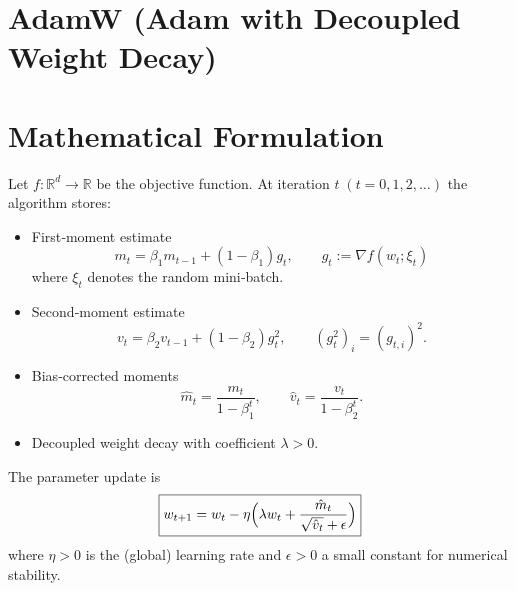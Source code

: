 \documentclass{article}
\newcommand{\R}{\mathbb{R}}
\begin{document}
\section*{AdamW (Adam with Decoupled Weight Decay)}

\section*{Mathematical Formulation}
Let $f:\R^{d}\rightarrow\R$ be the objective function.  
At iteration $t\;(t=0,1,2,\dots)$ the algorithm stores:

\begin{itemize}
  \item First‑moment estimate 
        \[
        m_{t}= \beta_{1}m_{t-1}+(1-\beta_{1})g_{t},
        \qquad g_{t}:=\nabla f(w_{t};\xi_{t}) 
        \] 
        where $\xi_{t}$ denotes the random mini‑batch.
  \item Second‑moment estimate 
        \[
        v_{t}= \beta_{2}v_{t-1}+(1-\beta_{2})g_{t}^{2},
        \qquad (g_{t}^{2})_{i}= (g_{t,i})^{2}.
        \] 
  \item Bias‑corrected moments 
        \[
        \hat m_{t}= \frac{m_{t}}{1-\beta_{1}^{t}},\qquad 
        \hat v_{t}= \frac{v_{t}}{1-\beta_{2}^{t}}.
        \] 
  \item Decoupled weight decay with coefficient $\lambda>0$.
\end{itemize}
The parameter update is
\begin{equation}
\boxed{
w_{t+1}= w_{t}-\eta \Bigl(\lambda w_{t}+\frac{\hat m_{t}}{\sqrt{\hat v_{t}}+\epsilon}\Bigr)
}
\label{eq:update}
\end{equation}
where $\eta>0$ is the (global) learning rate and $\epsilon>0$ a small constant for numerical stability.

\end{document}
